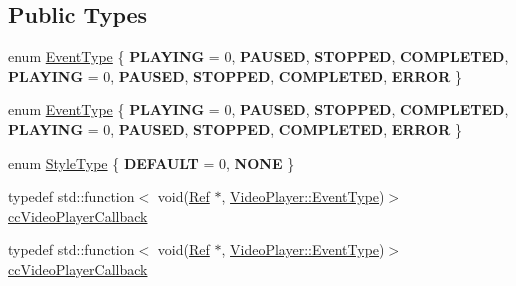 \subsection*{Public Types}
\begin{DoxyCompactItemize}
\item 
enum \hyperlink{classexperimental_1_1ui_1_1VideoPlayer_a29899b427d61c030036fda6c5ddcb10a}{Event\+Type} \{ \newline
{\bfseries P\+L\+A\+Y\+I\+NG} = 0, 
{\bfseries P\+A\+U\+S\+ED}, 
{\bfseries S\+T\+O\+P\+P\+ED}, 
{\bfseries C\+O\+M\+P\+L\+E\+T\+ED}, 
\newline
{\bfseries P\+L\+A\+Y\+I\+NG} = 0, 
{\bfseries P\+A\+U\+S\+ED}, 
{\bfseries S\+T\+O\+P\+P\+ED}, 
{\bfseries C\+O\+M\+P\+L\+E\+T\+ED}, 
\newline
{\bfseries E\+R\+R\+OR}
 \}
\item 
enum \hyperlink{classexperimental_1_1ui_1_1VideoPlayer_a29899b427d61c030036fda6c5ddcb10a}{Event\+Type} \{ \newline
{\bfseries P\+L\+A\+Y\+I\+NG} = 0, 
{\bfseries P\+A\+U\+S\+ED}, 
{\bfseries S\+T\+O\+P\+P\+ED}, 
{\bfseries C\+O\+M\+P\+L\+E\+T\+ED}, 
\newline
{\bfseries P\+L\+A\+Y\+I\+NG} = 0, 
{\bfseries P\+A\+U\+S\+ED}, 
{\bfseries S\+T\+O\+P\+P\+ED}, 
{\bfseries C\+O\+M\+P\+L\+E\+T\+ED}, 
\newline
{\bfseries E\+R\+R\+OR}
 \}
\item 
enum \hyperlink{classexperimental_1_1ui_1_1VideoPlayer_a65711269d4eca8fe125aeda2928a80ec}{Style\+Type} \{ {\bfseries D\+E\+F\+A\+U\+LT} = 0, 
{\bfseries N\+O\+NE}
 \}
\item 
typedef std\+::function$<$ void(\hyperlink{classRef}{Ref} $\ast$, \hyperlink{classexperimental_1_1ui_1_1VideoPlayer_a29899b427d61c030036fda6c5ddcb10a}{Video\+Player\+::\+Event\+Type})$>$ \hyperlink{classexperimental_1_1ui_1_1VideoPlayer_a64ebf250429fec0efea303b13cecf02e}{cc\+Video\+Player\+Callback}
\item 
typedef std\+::function$<$ void(\hyperlink{classRef}{Ref} $\ast$, \hyperlink{classexperimental_1_1ui_1_1VideoPlayer_a29899b427d61c030036fda6c5ddcb10a}{Video\+Player\+::\+Event\+Type})$>$ \hyperlink{classexperimental_1_1ui_1_1VideoPlayer_a64ebf250429fec0efea303b13cecf02e}{cc\+Video\+Player\+Callback}
\end{DoxyCompactItemize}
